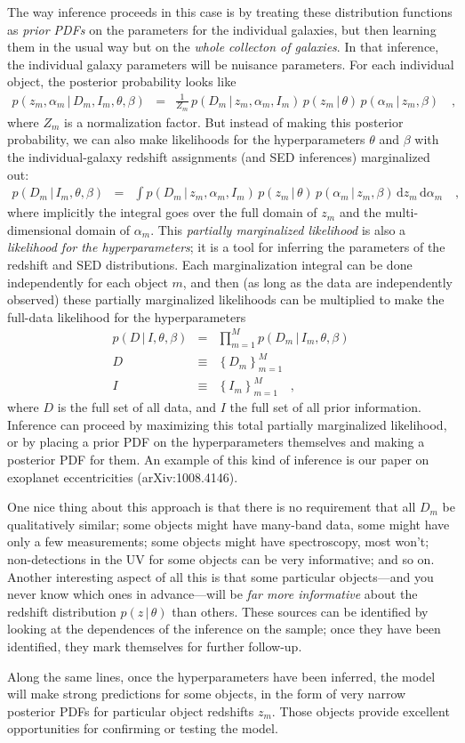 \documentclass[12pt]{article}
\newcommand{\given}{\,|\,}
\newcommand{\dd}{\mathrm d}
\begin{document}
The way inference proceeds in this case is by treating these
distribution functions as \emph{prior PDFs} on the parameters for the
individual galaxies, but then learning them in the usual way but on
the \emph{whole collecton of galaxies}.  In that inference, the
individual galaxy parameters will be nuisance parameters.  For each
individual object, the posterior probability looks like
\begin{eqnarray}\displaystyle
p(z_m, \alpha_m \given D_m, I_m, \theta, \beta) &=&
  \frac{1}{Z_m}\,p(D_m \given z_m, \alpha_m, I_m)
  \,p(z_m \given \theta)\,p(\alpha_m \given z_m, \beta)
\quad ,
\end{eqnarray}
where $Z_m$ is a normalization factor.  But instead of making this
posterior probability, we can also make likelihoods for the
hyperparameters $\theta$ and $\beta$ with the individual-galaxy
redshift assignments (and SED inferences) marginalized out:
\begin{eqnarray}\displaystyle
p(D_m \given I_m, \theta, \beta) &=&
  \int p(D_m \given z_m, \alpha_m, I_m)
  \,p(z_m \given \theta)\,p(\alpha_m \given z_m, \beta)\,\dd z_m\,\dd\alpha_m
\quad ,
\end{eqnarray}
where implicitly the integral goes over the full domain of $z_m$ and
the multi-dimensional domain of $\alpha_m$.  This \emph{partially
  marginalized likelihood} is also a \emph{likelihood for the
  hyperparameters}; it is a tool for inferring the parameters of the
redshift and SED distributions.  Each marginalization integral can be
done independently for each object $m$, and then (as long as the data
are independently observed) these partially marginalized likelihoods
can be multiplied to make the full-data likelihood for the
hyperparameters
\begin{eqnarray}\displaystyle
p(D \given I, \theta, \beta) &=&
  \prod_{m=1}^M p(D_m \given I_m, \theta, \beta)
\\
D &\equiv& \left\{D_m\right\}_{m=1}^M
\\
I &\equiv& \left\{I_m\right\}_{m=1}^M
\quad ,
\end{eqnarray}
where $D$ is the full set of all data, and $I$ the full set of all
prior information.  Inference can proceed by maximizing this total
partially marginalized likelihood, or by placing a prior PDF on the
hyperparameters themselves and making a posterior PDF for them.  An
example of this kind of inference is our paper on exoplanet
eccentricities (arXiv:1008.4146).

One nice thing about this approach is that there is no requirement
that all $D_m$ be qualitatively similar; some objects might have
many-band data, some might have only a few measurements; some objects
might have spectroscopy, most won't; non-detections in the UV for some
objects can be very informative; and so on.  Another interesting
aspect of all this is that some particular objects---and you never
know which ones in advance---will be \emph{far more informative} about
the redshift distribution $p(z \given \theta)$ than others.  These
sources can be identified by looking at the dependences of the
inference on the sample; once they have been identified, they mark
themselves for further follow-up.

Along the same lines, once the hyperparameters have been inferred, the
model will make strong predictions for some objects, in the form of
very narrow posterior PDFs for particular object redshifts $z_m$.
Those objects provide excellent opportunities for confirming or
testing the model.
\end{document}
